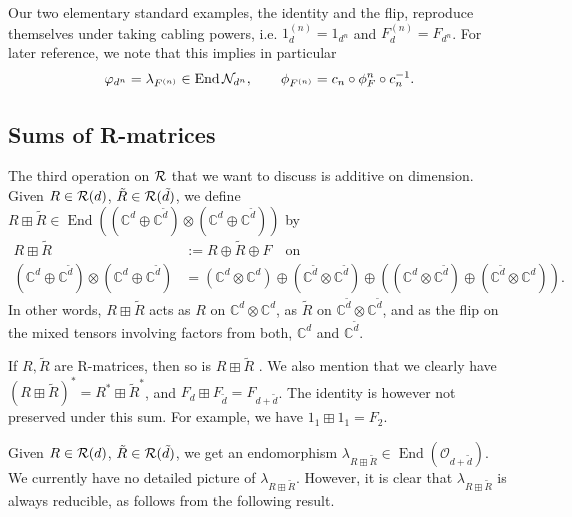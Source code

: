 \documentclass[12pt,a4paper]{amsart}
\numberwithin{equation}{section}
\theoremstyle{remark}
\def\End{\operatorname{End}}
\newcommand{\ot}{\otimes}
\newcommand{\Cl}{\mathbb{C}}
\newcommand{\la}{\lambda}
\newcommand{\CO}[0]{\mathcal{O}} \newcommand{\CP}[0]{\mathcal{P}}
\begin{document}
Our two elementary standard examples, the identity and the flip, reproduce themselves under taking cabling powers, i.e. $1_d^{(n)}=1_{d^n}$ and $F_d^{(n)}=F_{d^n}$. For later reference, we note that this implies in particular
\begin{align}\label{eq:shiftcablingpowers}
    \varphi_{d^n} = \la_{F^{(n)}}\in\End\CN_{d^n},\qquad
    \phi_{F^{(n)}} = c_n\circ\phi_F^n\circ c_n^{-1}. 
\end{align}


\subsection{Sums of R-matrices}\label{section:sums}

The third operation on $\mathcal{R}$ that we want to discuss is additive on dimension. Given $R\in\mathcal{R}(d)$, $\tilde R\in\mathcal{R}(\tilde d)$, we define $R\boxplus\tilde R\in\End((\Cl^d\oplus\Cl^{\tilde d})\ot(\Cl^d\oplus\Cl^{\tilde d}))$ by \cite{LechnerPennigWood:2019}
\begin{align}\label{eq:DefBoxplus}
	R\boxplus \tilde R 
	&:= R\oplus \tilde R\oplus F\quad\text{on}\\
	(\Cl^d\oplus\Cl^{\tilde d})\ot(\Cl^d\oplus\Cl^{\tilde d}) 
	&= (\Cl^d\ot \Cl^{d})\oplus(\Cl^{\tilde d}\ot \Cl^{\tilde d})\oplus((\Cl^{d}\ot \Cl^{\tilde d})\oplus(\Cl^{\tilde d}\ot \Cl^{d})).\nonumber
\end{align}
In other words, $R\boxplus \tilde R$ acts as $R$ on $\Cl^{d}\ot\Cl^{d}$, as $\tilde R$ on $\Cl^{\tilde d}\ot\Cl^{\tilde d}$, and as the flip on the mixed tensors involving factors from both, $\Cl^{d}$ and $\Cl^{\tilde d}$.

If $R,\tilde R$ are R-matrices, then so is $R\boxplus \tilde R$ \cite{LechnerPennigWood:2019}. We also mention that we clearly have $(R\boxplus \tilde R)^*=R^*\boxplus \tilde R^*$, and $F_d\boxplus F_{\tilde d}=F_{d+\tilde d}$. The identity is however not preserved under this sum. For example, we have $1_1\boxplus1_1=F_2$.

Given $R\in\mathcal{R}(d)$, $\tilde R\in\mathcal{R}(\tilde d)$, we get an endomorphism $\la_{R\boxplus\tilde R}\in\End(\CO_{d+\tilde d})$. We currently have no detailed picture of $\la_{R\boxplus\tilde R}$. However, it is clear that $\la_{R\boxplus\tilde R}$ is always reducible, as follows from the following result.
\end{document}
